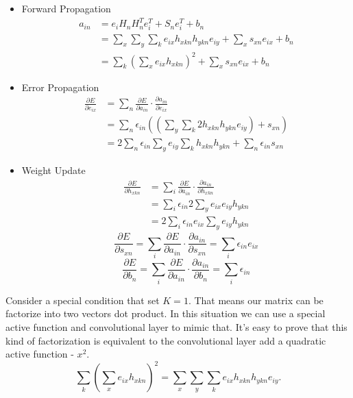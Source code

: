 \documentclass[12pt]{article}
\begin{document}
\begin{itemize}
    \item Forward Propagation
        \begin{equation}
        \begin{split}
            a_{in} &= e_i H_n H^T_n e_i^T + S_ne_i^T + b_n \\
            &= \sum_x \sum_y \sum_k e_{ix}h_{xkn}h_{ykn}e_{iy} + \sum_x s_{xn}e_{ix} + b_n \\
            &= \sum_k (\sum_x e_{ix}h_{xkn})^2 + \sum_x s_{xn}e_{ix} + b_n
        \end{split}
        \end{equation}
    \item Error Propagation
        \begin{equation}
        \begin{split}
            \frac{\partial E}{\partial e_{ix}} &= \sum_n \frac{\partial E}{\partial a_{in}} \cdot \frac{\partial a_{in}}{\partial e_{ix}} \\
            &= \sum_n  \epsilon_{in} ((\sum_y \sum_k 2 h_{xkn} h_{ykn} e_{iy}) + s_{xn}) \\
            &= 2 \sum_n  \epsilon_{in} \sum_y e_{iy} \sum_k h_{xkn} h_{ykn} + \sum_n  \epsilon_{in} s_{xn}
        \end{split}
        \end{equation}
    \item Weight Update
        \begin{equation}
            \begin{split}
            \frac{\partial E}{\partial h_{xkn}} &= \sum_i \frac{\partial E}{\partial a_{in}} \cdot \frac{\partial a_{in}}{\partial h_{xkn}} \\
            &= \sum_i  \epsilon_{in} 2 \sum_y e_{ix} e_{iy} h_{ykn} \\
            &= 2 \sum_i \epsilon_{in} e_{ix} \sum_y e_{iy} h_{ykn}
            \end{split}
        \end{equation}
        \begin{equation}
        \frac{\partial E}{\partial s_{xn}} = \sum_i \frac{\partial E}{\partial a_{in}} \cdot \frac{\partial a_{in}}{\partial s_{xn}} = \sum_i  \epsilon_{in} e_{ix}
        \end{equation}
        \begin{equation}
        \frac{\partial E}{\partial b_n} = \sum_i \frac{\partial E}{\partial a_{in}} \cdot \frac{\partial a_{in}}{\partial b_n} = \sum_i  \epsilon_{in}
        \end{equation}
\end{itemize}
Consider a special condition that set $K=1$. That means our matrix can be factorize into two vectors dot product. In this situation we can use a special active function and convolutional layer to mimic that. It's easy to prove that this kind of factorization is equivalent to the convolutional layer add a quadratic active function - $x^2$.
\begin{equation}
    \sum_k (\sum_x e_{ix}h_{xkn})^2 = \sum_x \sum_y \sum_k e_{ix}h_{xkn}h_{ykn}e_{iy}.
\end{equation}
\end{document}
